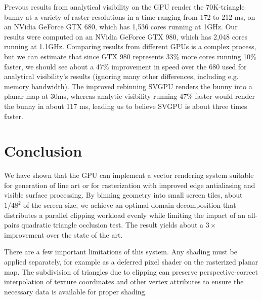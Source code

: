 \documentclass[review]{acmsiggraph}
\begin{document}
Prevous results from analytical visibility on the GPU \cite{auzinger2013}
render the 70K-triangle bunny at a variety of raster resolutions in a time
ranging from 172 to 212 ms, on an NVidia GeForce GTX 680, which has 1,536
cores running at 1GHz. Our results were computed on an NVidia GeForce GTX 980,
which has 2,048 cores running at 1.1GHz. Comparing results from different
GPUs is a complex process, but we can estimate that since GTX 980 represents
33\% more cores running 10\% faster, we should see about a 47\% improvement in
speed over the 680 used for analytical visibility's results (ignoring many
other differences, including e.g. memory bandwidth). The improved rebinning
SVGPU renders the bunny into a planar map at 30ms, whereas analytic visibility
running 47\% faster would render the bunny in about 117 ms, leading us to
believe SVGPU is about three times faster.
 
\section{Conclusion}

We have shown that the GPU can implement a vector rendering system suitable
for generation of line art or for rasterization with improved edge
antialiasing and visible surface processing. By binning geometry into small
screen tiles, about $1/48^2$ of the screen size, we achieve an optimal domain
decomposition that distributes a parallel clipping workload evenly while
limiting the impact of an all-pairs quadratic triangle occlusion test. The
result yields about a $3\times$ improvement over the state of the art.

There are a few important limitations of this system. Any shading must be
applied separately, for example as a deferred pixel shader on the rasterized
planar map. The subdivision of triangles due to clipping can preserve
perspective-correct interpolation of texture coordinates and other vertex
attributes to ensure the necessary data is available for proper shading.
\end{document}
